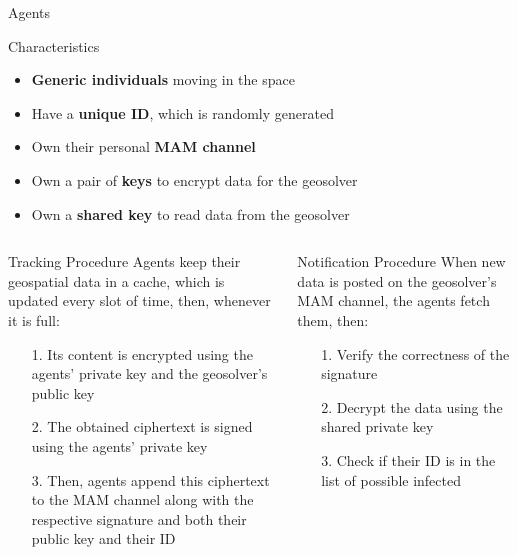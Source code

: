 \begin{frame}{Agents}
    \begin{block}{Characteristics}
        \begin{itemize}
            \item \textbf{Generic individuals} moving in the space
            \item Have a \textbf{unique ID}, which is randomly generated
            \item Own their personal \textbf{MAM channel}
            \item Own a pair of \textbf{keys} to encrypt data for the geosolver
            \item Own a \textbf{shared key} to read data from the geosolver
        \end{itemize}
    \end{block}
    
    \vspace{-10pt}
    
    \begin{columns}[T]
        \begin{block}{Tracking Procedure}
            Agents keep their geospatial data in a cache, which is updated every slot of time, then, whenever it is full:
            \begin{itemize} 
                \item [1.] Its content is encrypted using the agents' private key and the geosolver's public key
                \item [2.] The obtained ciphertext is signed using the agents' private key
                \item [3.] Then, agents append this ciphertext to the MAM channel along with the respective signature and both their public key and their ID
            \end{itemize}
        \end{block}
        
        \begin{block}{Notification Procedure}
            When new data is posted on the geosolver's MAM channel, the agents fetch them, then:
            \begin{itemize}
                \item [1.] Verify the correctness of the signature
                \item [2.] Decrypt the data using the shared private key
                \item [3.] Check if their ID is in the list of possible infected
            \end{itemize}
        \end{block}
    \end{columns}
\end{frame}